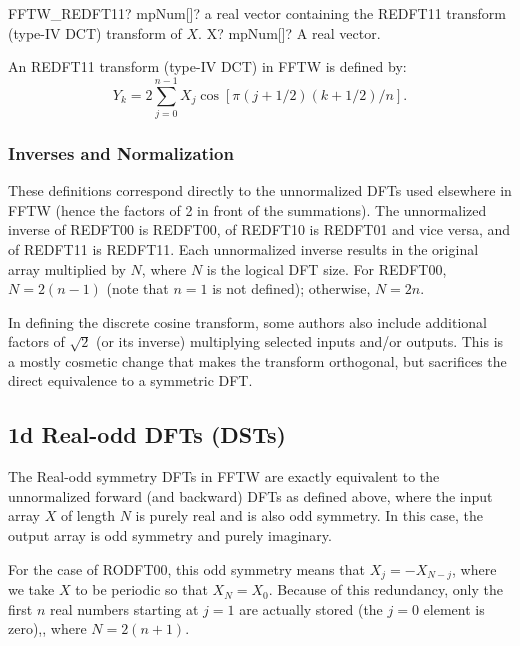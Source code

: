\begin{mpFunctionsExtract}
	\mpFunctionOne
	{FFTW\_REDFT11? mpNum[]? a real vector containing the REDFT11 transform (type-IV DCT) transform of $X$.}
	{X? mpNum[]? A real vector.}
\end{mpFunctionsExtract}

\vspace{0.3cm}
An REDFT11 transform (type-IV DCT) in FFTW is defined by:
\begin{equation}
Y_k = 2 \sum^{n-1}_{j=0} X_j \cos[\pi (j+1/2)(k+1/2)/n].
\end{equation}


\subsubsection{Inverses and Normalization}
These definitions correspond directly to the unnormalized DFTs used elsewhere in FFTW
(hence the factors of 2 in front of the summations). The unnormalized inverse of REDFT00
is REDFT00, of REDFT10 is REDFT01 and vice versa, and of REDFT11 is REDFT11. Each
unnormalized inverse results in the original array multiplied by $N$, where $N$ is the logical DFT size. For REDFT00, $N = 2(n - 1)$ (note that $n = 1$ is not defined); otherwise, $N = 2n$.


In defining the discrete cosine transform, some authors also include additional factors of
$\sqrt{2}$ (or its inverse) multiplying selected inputs and/or outputs. This is a mostly cosmetic change that makes the transform orthogonal, but sacrifices the direct equivalence to a symmetric DFT.






\subsection{1d Real-odd DFTs (DSTs)}

The Real-odd symmetry DFTs in FFTW are exactly equivalent to the unnormalized forward (and backward) DFTs as defined above, where the input array $X$ of length $N$ is purely real and is also odd symmetry. In this case, the output array is  odd symmetry and purely imaginary.

For the case of RODFT00, this odd symmetry means that $X_j = -X_{N-j}$, where we take $X$ to
be periodic so that $X_N = X_0$. Because of this redundancy, only the first $n$ real numbers
starting at $j = 1$ are actually stored (the $j = 0$ element is zero),, where $N = 2(n + 1)$.



